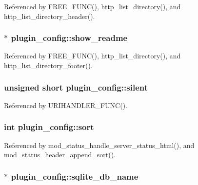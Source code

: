 Referenced by F\-R\-E\-E\-\_\-\-F\-U\-N\-C(), http\-\_\-list\-\_\-directory(), and http\-\_\-list\-\_\-directory\-\_\-header().

\hypertarget{structplugin__config_ae40e447885946652ab184de8ddf192da}{
\subsubsection[{show\-\_\-readme}]{$\ast$ plugin\-\_\-config\-::show\-\_\-readme}}\label{structplugin__config_ae40e447885946652ab184de8ddf192da}


Referenced by F\-R\-E\-E\-\_\-\-F\-U\-N\-C(), http\-\_\-list\-\_\-directory(), and http\-\_\-list\-\_\-directory\-\_\-footer().

\hypertarget{structplugin__config_a708b5822420979a10ef1321c5aba9e45}{
\subsubsection[{silent}]{\setlength{\rightskip}{0pt plus 5cm}unsigned short plugin\-\_\-config\-::silent}}\label{structplugin__config_a708b5822420979a10ef1321c5aba9e45}


Referenced by U\-R\-I\-H\-A\-N\-D\-L\-E\-R\-\_\-\-F\-U\-N\-C().

\hypertarget{structplugin__config_a23038956d73aa3c2e2d167a7623f7466}{
\subsubsection[{sort}]{\setlength{\rightskip}{0pt plus 5cm}int plugin\-\_\-config\-::sort}}\label{structplugin__config_a23038956d73aa3c2e2d167a7623f7466}


Referenced by mod\-\_\-status\-\_\-handle\-\_\-server\-\_\-status\-\_\-html(), and mod\-\_\-status\-\_\-header\-\_\-append\-\_\-sort().

\hypertarget{structplugin__config_aeb366b3184e29302be12a34ddfe85a2b}{
\subsubsection[{sqlite\-\_\-db\-\_\-name}]{$\ast$ plugin\-\_\-config\-::sqlite\-\_\-db\-\_\-name}}\label{structplugin__config_aeb366b3184e29302be12a34ddfe85a2b}


